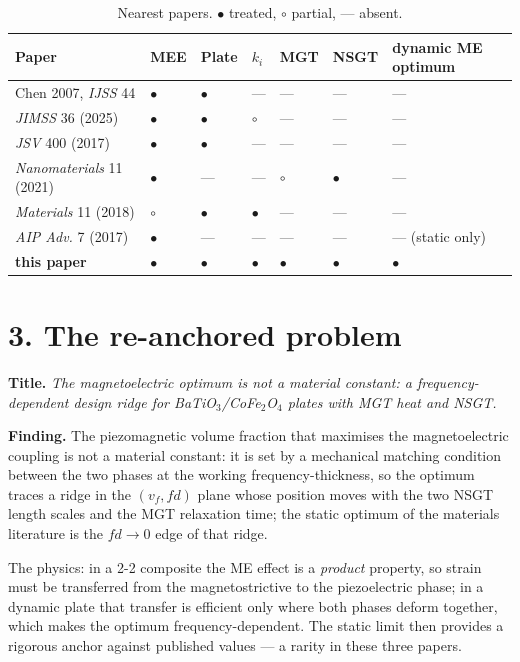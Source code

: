\documentclass[11pt]{article}
\begin{document}
\begin{table}[h]
\centering\small
\caption{Nearest papers. $\bullet$ treated, $\circ$ partial, --- absent.}
\begin{tabular}{p{5.4cm}p{1.0cm}p{1.0cm}p{1.1cm}p{1.0cm}p{1.0cm}p{1.5cm}}
\hline
Paper & MEE & Plate & $k_i$ & MGT & NSGT & dynamic ME optimum \\
\hline
Chen 2007, \emph{IJSS} 44 & $\bullet$ & $\bullet$ & --- & --- & --- & --- \\
\emph{JIMSS} 36 (2025) & $\bullet$ & $\bullet$ & $\circ$ & --- & --- & --- \\
\emph{JSV} 400 (2017) & $\bullet$ & $\bullet$ & --- & --- & --- & --- \\
\emph{Nanomaterials} 11 (2021) & $\bullet$ & --- & --- & $\circ$ & $\bullet$ & --- \\
\emph{Materials} 11 (2018) & $\circ$ & $\bullet$ & $\bullet$ & --- & --- & --- \\
\emph{AIP Adv.} 7 (2017) & $\bullet$ & --- & --- & --- & --- & --- (static only) \\
\hline
\textbf{this paper} & $\bullet$ & $\bullet$ & $\bullet$ & $\bullet$ & $\bullet$ & $\bullet$ \\
\hline
\end{tabular}
\end{table}

\section*{3. The re-anchored problem}
\textbf{Title.} \emph{The magnetoelectric optimum is not a material constant: a frequency-dependent
design ridge for BaTiO$_3$/CoFe$_2$O$_4$ plates with MGT heat and NSGT.}

\textbf{Finding.} The piezomagnetic volume fraction that maximises the magnetoelectric coupling is
not a material constant: it is set by a mechanical matching condition between the two phases at the
working frequency-thickness, so the optimum traces a ridge in the $(v_f,fd)$ plane whose position
moves with the two NSGT length scales and the MGT relaxation time; the static optimum of the
materials literature is the $fd\to0$ edge of that ridge.

The physics: in a 2-2 composite the ME effect is a \emph{product} property, so strain must be
transferred from the magnetostrictive to the piezoelectric phase; in a dynamic plate that transfer is
efficient only where both phases deform together, which makes the optimum frequency-dependent. The
static limit then provides a rigorous anchor against published values --- a rarity in these three
papers.
\end{document}
